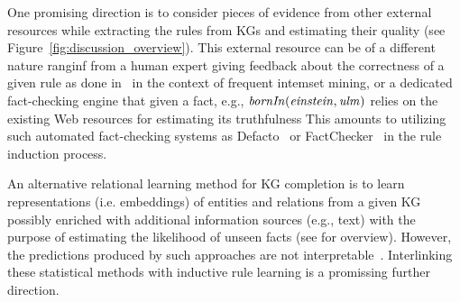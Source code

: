 One promising direction is to consider pieces of evidence from other external resources while extracting the rules from KGs and estimating their quality %
(see Figure~\ref{fig:discussion_overview}). This external resource can be of a different nature ranginf from %
a human expert giving feedback about the correctness of %
a given rule %
as done in~\cite{Dzyuba2017} in the context of frequent intemset mining, %
or a dedicated fact-checking engine that given a fact, e.g., $\mathit{bornIn(einstein,ulm)}$ relies on the existing Web resources for estimating its truthfulness %
This amounts to utilizing such automated fact-checking systems as Defacto~\cite{defacto} or FactChecker~\cite{factchecker} in the rule induction process. %

 An alternative relational learning method for KG completion is to learn representations (i.e. embeddings) of entities and relations from a given KG possibly enriched with additional information sources (e.g., text) with the %
purpose of estimating the likelihood of unseen facts  %
(see \cite{Wang2017} for overview). However, %
the
predictions produced by such approaches are not interpretable~\cite{Shakerin2018}. %
Interlinking these statistical methods with inductive rule learning is a promissing further direction.

